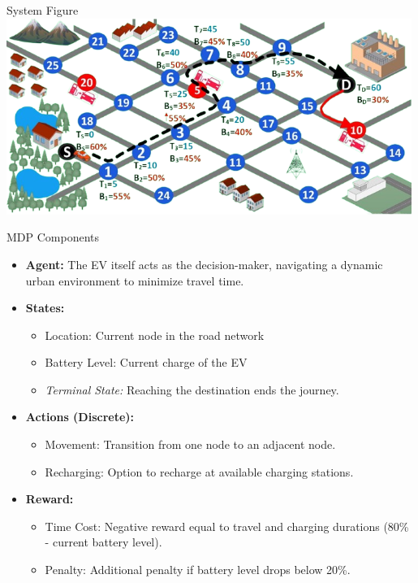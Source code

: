 \documentclass{beamer}
\begin{document}
\begin{frame}{System Figure}
  \centering
  \includegraphics[width=0.99\textwidth]{figs/System_Model2_page-0001-removebg-preview (1).png}
\end{frame}

\begin{frame}{MDP Components}
  \begin{itemize}
    \item \textbf{Agent:} The EV itself acts as the decision-maker, navigating a dynamic urban environment to minimize travel time.
    \pause
    \item \textbf{States:}
      \begin{itemize}
        \item Location: Current node in the road network
        \item Battery Level: Current charge of the EV
        \item \textit{Terminal State:} Reaching the destination ends the journey.
      \end{itemize}
    \pause
    \item \textbf{Actions (Discrete):}
      \begin{itemize}
        \item Movement: Transition from one node to an adjacent node.
        \item Recharging: Option to recharge at available charging stations.
      \end{itemize}
    \pause
    \item \textbf{Reward:}
      \begin{itemize}
        \item Time Cost: Negative reward equal to travel and charging durations (80\% - current battery level).
        \item Penalty: Additional penalty if battery level drops below 20\%.
      \end{itemize}
  \end{itemize}
\end{frame}
\end{document}

